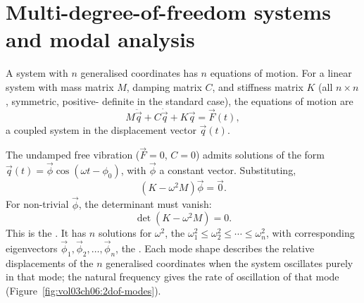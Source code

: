 \section{Multi-degree-of-freedom systems and modal analysis}

A system with $n$ generalised coordinates has $n$ equations of
motion. For a linear system with mass matrix $M$, damping matrix $C$,
and stiffness matrix $K$ (all $n \times n$, symmetric, positive-
definite in the standard case), the equations of motion are
\[
M\ddot{\vec{q}} + C\dot{\vec{q}} + K\vec{q} = \vec{F}(t),
\]
a coupled system in the displacement vector $\vec{q}(t)$.

The undamped free vibration ($\vec{F} = 0$, $C = 0$) admits solutions
of the form $\vec{q}(t) = \vec{\phi} \cos(\omega t - \phi_0)$, with
$\vec{\phi}$ a constant vector. Substituting,
\[
(K - \omega^2 M)\vec{\phi} = \vec{0}.
\]
For non-trivial $\vec{\phi}$, the determinant must vanish:
\[
\det(K - \omega^2 M) = 0.
\]
This is the . It has $n$
solutions for $\omega^2$, the 
$\omega_1^2 \leq \omega_2^2 \leq \cdots \leq \omega_n^2$, with
corresponding eigenvectors $\vec{\phi}_1, \vec{\phi}_2, \ldots,
\vec{\phi}_n$, the . Each mode shape describes
the relative displacements of the $n$ generalised coordinates when
the system oscillates purely in that mode; the natural frequency
gives the rate of oscillation of that mode
(Figure~\ref{fig:vol03ch06:2dof-modes}).



